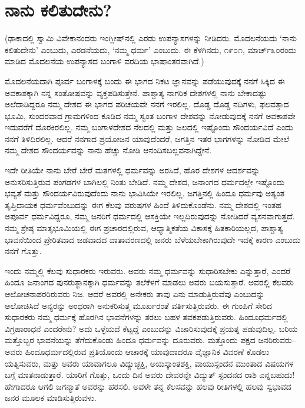 
\chapter{ನಾನು ಕಲಿತುದೇನು?}

(ಢಾಕಾದಲ್ಲಿ ಸ್ವಾಮಿ ವಿವೇಕಾನಂದರು ಇಂಗ್ಲೀಷ್​ನಲ್ಲಿ ಎರಡು ಉಪನ್ಯಾಸಗಳನ್ನು ನೀಡಿದರು. ಮೊದಲನೆಯದು ‘ನಾನು ಕಲಿತುದೇನು’ ಎಂಬುದು, ಎರಡನೆಯದು, ‘ನಮ್ಮ ಧರ್ಮ’ ಎಂಬುದು. ಈ ಕೆಳಗಿನದು, ೧೯೦೧, ಮಾರ್ಚ್​ ೩೦ರಂದು ಮಾಡಿದ ಮೊದಲನೆಯ ಉಪನ್ಯಾಸದ ಬಂಗಾಳಿ ವರದಿಯ ಭಾಷಾಂತರವಾಗಿದೆ.)

ಮೊದಲನೆಯದಾಗಿ ಪೂರ್ವ ಬಂಗಾಳಕ್ಕೆ ಬಂದು ಈ ಭಾಗದ ನಿಕಟ ಜ್ಞಾನವನ್ನು ಪಡೆಯುವುದಕ್ಕೆ ನನಗೆ ಸಿಕ್ಕಿದ ಈ ಅವಕಾಶಕ್ಕಾಗಿ ನನ್ನ ಸಂತೋಷವನ್ನು ವ್ಯಕ್ತಪಡಿಸುತ್ತೇನೆ. ಪಾಶ್ಚಾತ್ಯ ನಾಗರಿಕ ದೇಶಗಳಲ್ಲಿ ನಾನು ಬೇಕಾದಷ್ಟು ಅಲೆದಾಡಿದ್ದರೂ ನಮ್ಮ ದೇಶದ ಈ ಭಾಗದ ಪರಿಚಯವೇ ನನಗೆ ಇರಲಿಲ್ಲ. ದೊಡ್ಡ ದೊಡ್ಡ ನದಿಗಳು, ಫಲವತ್ತಾದ ಭೂಮಿ, ಸುಂದರವಾದ ಗ್ರಾಮಗಳಿಂದ ಕೂಡಿದ ನಮ್ಮ ಸ್ವಂತ ಬಂಗಾಳ ದೇಶವನ್ನು ನೋಡುವುದಕ್ಕೆ ನನಗೆ ಅವಕಾಶವೇ ಇದುವರೆಗೆ ದೊರಕಿರಲಿಲ್ಲ. ನಮ್ಮ ಬಂಗಾಳದೇಶದ ನೆಲದಲ್ಲಿ ಮತ್ತು ಜಲದಲ್ಲಿ ಇಷ್ಟೊಂದು ಸೌಂದರ್ಯವಿದೆ ಎಂದು ನನಗೆ ತಿಳಿದಿರಲಿಲ್ಲ. ಆದರೆ ನನಗಾದ ಪ್ರಯೋಜನ ಯಾವುದೆಂದರೆ, ಜಗತ್ತಿನ ಇತರ ಭಾಗಗಳನ್ನು ನೋಡಿದ ಮೇಲೆ ನಮ್ಮ ದೇಶದ ಸೌಂದರ್ಯವನ್ನು ನಾನು ಹೆಚ್ಚು ನೋಡಿ ಆನಂದಿಸಬಲ್ಲವನಾಗಿದ್ದೇನೆ.

ಇದೇ ರೀತಿಯೇ ನಾನು ಬೇರೆ ಬೇರೆ ಮತಗಳಲ್ಲಿ ಧರ್ಮವನ್ನು ಅರಸಿದೆ, ಹೊರ ದೇಶಗಳ ಆದರ್ಶವನ್ನು ಅನುಸರಿಸುತ್ತಿರುವ ಪಂಗಡಗಳ ಬಾಗಿಲಲ್ಲಿ ನಿಂತು ಬೇಡಿದೆ. ನಮ್ಮ ದೇಶದ, ಜನಾಂಗದ ಧರ್ಮದಲ್ಲೇ ಇಷ್ಟೊಂದು ಭವ್ಯತೆ ಮತ್ತು ಸೌಂದರ್ಯವಿರುವುದೆಂದು ನಾನು ಭಾವಿಸಿಯೇ ಇರಲಿಲ್ಲ. ಜಗತ್ತಿನಲ್ಲಿ ಹಿಂದೂ ಧರ್ಮವು ಅತ್ಯಂತ ತೃಪ್ತಿದಾಯಕ ಧರ್ಮವೆಂಬುದನ್ನು ಈಗ ಕೆಲವು ವರುಷಗಳ ಹಿಂದೆ ತಿಳಿದುಕೊಂಡೆನು. ನಮ್ಮ ದೇಶದಲ್ಲಿ ಇಂತಹ ಅಪೂರ್ವ ಧರ್ಮವಿದ್ದರೂ, ನಮ್ಮ ಜನರಿಗೆ ಧರ್ಮದಲ್ಲಿ ಆಸಕ್ತಿಯೇ ಇಲ್ಲದಿರುವುದನ್ನು ನೋಡಿದರೆ ವ್ಯಸನವಾಗುತ್ತದೆ. ನಮ್ಮ ಶ್ರೇಷ್ಠ ಮಾತೃಭೂಮಿಯಲ್ಲಿ ಈಗ ಪ್ರಚಾರದಲ್ಲಿರುವ, ಆಧ್ಯಾತ್ಮಿಕತೆಯ ವಿಕಾಸಕ್ಕೆ ಹಿತಕಾರಿಯಲ್ಲದ, ಪಾಶ್ಚಾತ್ಯ ಭಾವನೆಯಿಂದ ಪ್ರೇರಿತವಾದ ಜಡವಾದದ ವಾತಾವರಣದಲ್ಲಿ ಜನರು ಬೆಳೆಯಬೇಕಾಗಿರುವುದೇ ಇದಕ್ಕೆ ಕಾರಣ ಎಂಬುದು ನನಗೆ ಗೊತ್ತು.

ಇಂದು ನಮ್ಮಲ್ಲಿ ಕೆಲವು ಸುಧಾರಕರು ಇರುವರು. ಅವರು ನಮ್ಮ ಧರ್ಮವನ್ನು ಸುಧಾರಿಸಬೇಕು ಎನ್ನುತ್ತಾರೆ, ಎಂದರೆ ಹಿಂದೂ ಜನಾಂಗದ ಪುನರುತ್ಥಾನಕ್ಕಾಗಿ ಧರ್ಮವನ್ನು ತಲೆಕೆಳಗೆ ಮಾಡಲು ಅವರು ಬಯಸುತ್ತಾರೆ. ಅವರಲ್ಲಿ ಕೆಲವರು ಆಲೋಚನಾಪರರಿರುವರು ನಿಜ. ಆದರೆ ಅವರಲ್ಲಿ ಅನೇಕರು ತಾವು ಏನು ಮಾಡುತ್ತಿರುವೆವು ಎಂಬುದನ್ನು ಆಲೋಚಿಸಿದೆ ಅನ್ಯರನ್ನು ಅಂಧರಾಗಿ ಅನುಕರಿಸುತ್ತ ಮೂರ್ಖರಂತೆ ವರ್ತಿಸುತ್ತಿರುವರು. ಈ ಗುಂಪಿಗೆ ಸೇರಿದ ಸುಧಾರಕರು ನಮ್ಮ ಧರ್ಮಕ್ಕೆ ಹೊರಗಿನ ಭಾವನೆಗಳನ್ನು ತರಲು ಬಹಳ ತವಕಪಡುತ್ತಿರುವರು. ಹಿಂದೂಧರ್ಮದಲ್ಲಿ ವಿಗ್ರಹಾರಾಧನೆ ಎಂದರೇನು? ಅದು ಒಳ್ಳೆಯದೆ ಕೆಟ್ಟದ್ದೆ ಎಂಬುದನ್ನು ವಿಚಾರಿಸುವುದಕ್ಕೆ ಪ್ರಯತ್ನ ಪಡುವುದಿಲ್ಲ. ಬರಿಯ ಮತ್ತೊಬ್ಬರ ಭಾವನೆಯನ್ನು ತೆಗೆದುಕೊಂಡು ಹಿಂದೂ ಧರ್ಮವನ್ನು ದೂರುವರು. ಮತ್ತೊಂದು ಪಕ್ಷದ ಜನರಿರುವರು–ಅವರು ಹಿಂದೂಧರ್ಮದಲ್ಲಿರುವ ಪ್ರತಿಯೊಂದು ಆಚಾರಕ್ಕೆ ಯಾವುದಾದರೂ ವೈಜ್ಞಾನಿಕ ವಿವರಣೆ ಕೊಡಲು ಯತ್ನಿಸುವರು, ಮತ್ತು ಅವರು ಯಾವಾಗಲೂ ವಿದ್ಯುಚ್ಛಕ್ತಿ, ಅಯಸ್ಕಾಂತಶಕ್ತಿ, ವಾಯುಸ್ಪಂದನ ಮುಂತಾದ ವಿಷಯಗಳ ಬಗ್ಗೆ ಮಾತನಾಡುತ್ತಾರೆ. ಯಾರಿಗೆ ಗೊತ್ತು, ಒಂದು ದಿನ ಅವರು ದೇವರನ್ನೇ ವಿದ್ಯುತ್​ ಸ್ಪಂದನದ ರಾಶಿ ಎನ್ನಬಹುದು! ಹೇಗಾದರೂ ಆಗಲಿ ಜಗನ್ಮಾತೆ ಅವರನ್ನು ಹರಸಲಿ. ಅವಳೇ ತನ್ನ ಕೆಲಸವನ್ನು ಹಲವು ರೀತಿಗಳಲ್ಲಿ ಹಲವು ಸ್ವಭಾವದ ಜನರ ಮೂಲಕ ಮಾಡಿಸುತ್ತಿರುವಳು.

